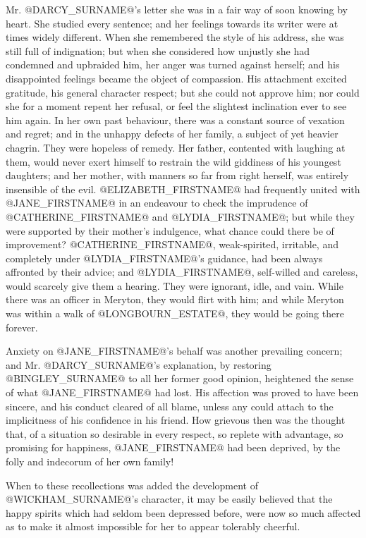 Mr. @DARCY_SURNAME@'s letter she was in a fair way of soon knowing by heart. She
studied every sentence; and her feelings towards its writer were at
times widely different. When she remembered the style of his address,
she was still full of indignation; but when she considered how unjustly
she had condemned and upbraided him, her anger was turned against
herself; and his disappointed feelings became the object of compassion.
His attachment excited gratitude, his general character respect; but she
could not approve him; nor could she for a moment repent her refusal,
or feel the slightest inclination ever to see him again. In her own past
behaviour, there was a constant source of vexation and regret; and in
the unhappy defects of her family, a subject of yet heavier chagrin.
They were hopeless of remedy. Her father, contented with laughing at
them, would never exert himself to restrain the wild giddiness of his
youngest daughters; and her mother, with manners so far from right
herself, was entirely insensible of the evil. @ELIZABETH_FIRSTNAME@ had frequently
united with @JANE_FIRSTNAME@ in an endeavour to check the imprudence of @CATHERINE_FIRSTNAME@
and @LYDIA_FIRSTNAME@; but while they were supported by their mother's indulgence,
what chance could there be of improvement? @CATHERINE_FIRSTNAME@, weak-spirited,
irritable, and completely under @LYDIA_FIRSTNAME@'s guidance, had been always
affronted by their advice; and @LYDIA_FIRSTNAME@, self-willed and careless, would
scarcely give them a hearing. They were ignorant, idle, and vain. While
there was an officer in Meryton, they would flirt with him; and while
Meryton was within a walk of @LONGBOURN_ESTATE@, they would be going there
forever.

Anxiety on @JANE_FIRSTNAME@'s behalf was another prevailing concern; and Mr. @DARCY_SURNAME@'s
explanation, by restoring @BINGLEY_SURNAME@ to all her former good opinion,
heightened the sense of what @JANE_FIRSTNAME@ had lost. His affection was proved
to have been sincere, and his conduct cleared of all blame, unless any
could attach to the implicitness of his confidence in his friend. How
grievous then was the thought that, of a situation so desirable in every
respect, so replete with advantage, so promising for happiness, @JANE_FIRSTNAME@ had
been deprived, by the folly and indecorum of her own family!

When to these recollections was added the development of @WICKHAM_SURNAME@'s
character, it may be easily believed that the happy spirits which had
seldom been depressed before, were now so much affected as to make it
almost impossible for her to appear tolerably cheerful.

